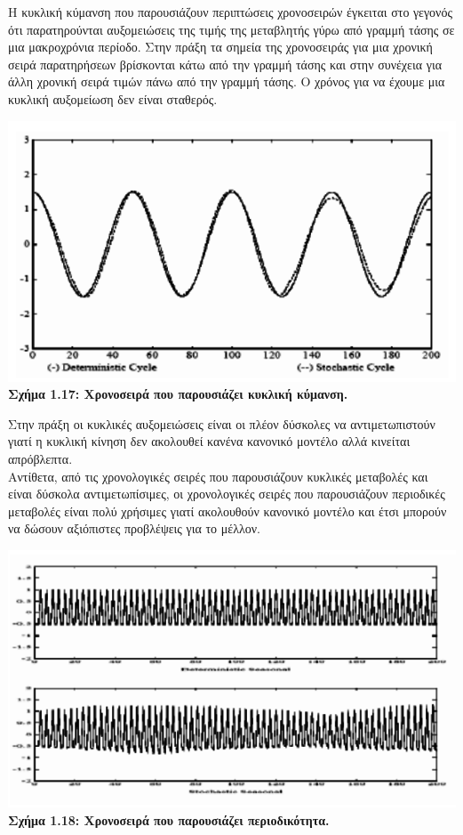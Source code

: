 Η κυκλική κύμανση που παρουσιάζουν περιπτώσεις χρονοσειρών έγκειται στο γεγονός ότι παρατηρούνται αυξομειώσεις της τιμής της μεταβλητής
γύρω από γραμμή τάσης σε μια μακροχρόνια περίοδο. Στην πράξη τα σημεία της
χρονοσειράς για μια χρονική σειρά παρατηρήσεων βρίσκονται κάτω από την
γραμμή τάσης και στην συνέχεια για άλλη χρονική σειρά τιμών πάνω από την γραμμή
τάσης. Ο χρόνος για να έχουμε μια κυκλική αυξομείωση δεν είναι σταθερός.
\begin{center}
\includegraphics[scale=0.5]{graf15.png}\\
\textbf{Σχήμα 1.17: Xρονοσειρά που παρουσιάζει κυκλική κύμανση.}
\end{center}
Στην πράξη οι κυκλικές αυξομειώσεις είναι οι πλέον δύσκολες να αντιμετωπιστούν γιατί η κυκλική κίνηση δεν ακολουθεί κανένα κανονικό μοντέλο
αλλά κινείται απρόβλεπτα.\\

Αντίθετα, από τις χρονολογικές σειρές που παρουσιάζουν κυκλικές μεταβολές
και είναι δύσκολα αντιμετωπίσιμες, οι χρονολογικές σειρές που παρουσιάζουν
περιοδικές μεταβολές είναι πολύ χρήσιμες γιατί ακολουθούν κανονικό μοντέλο και
έτσι μπορούν να δώσουν αξιόπιστες προβλέψεις για το μέλλον.
\begin{center}
\includegraphics[scale=0.5]{graf16.png}\\
\textbf{Σχήμα 1.18: Xρονοσειρά που παρουσιάζει περιοδικότητα.}
\end{center}

